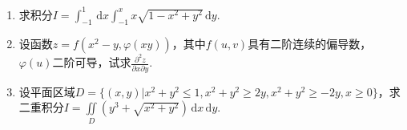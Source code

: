 \documentclass[../Main.tex]{subfiles}
\begin{document}
\begin{enumerate}
    \item 求积分$I=\int_{-1}^{1}\,\mathrm{d}x\int_{-1}^{x}x\sqrt{1-x^{2}+y^{2}}\,\mathrm{d}
              y$.
          \vspace{11em}

    \item 设函数$z=f\left(x^{2}-y,\varphi(xy)\right)$，其中$f(u,v)$具有二阶连续的偏导数，$\varphi
              (u)$二阶可导，试求$\frac{\partial^{2} z}{\partial x \partial y}$.
          \vspace{11em}

    \item 设平面区域$D=\{(x,y)|x^{2}+y^{2}\leq 1,x^{2}+y^{2}\geq 2y,x^{2}+y^{2}\geq
              -2y, x\geq0\}$，求二重积分$I=\iint\limits_{D}\left(y^{3}+\sqrt{x^{2}+y^{2}}
              \right)\,\mathrm{d}x\,\mathrm{d}y$.
          \vspace{11em}
\end{enumerate}
\end{document}
